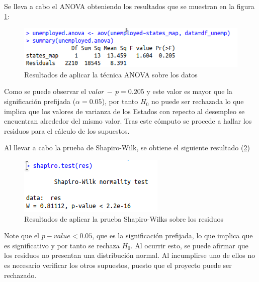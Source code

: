 \documentclass[a4paper,10pt,twocolumn]{article}
\begin{document}
Se lleva a cabo el ANOVA obteniendo los resultados que se muestran en la figura \ref{fig:anova_unemp}:
\begin{figure}[htb]
	\begin{center}
		\includegraphics[width=\columnwidth]{figures/unemployed_anova.png}
	\end{center}
	\caption{Resultados de aplicar la técnica ANOVA sobre los datos \label{fig:anova_unemp}}
\end{figure}

Como se puede observar el $valor \, -\, p = 0.205$ y este valor es mayor que la significación prefijada ($\alpha = 0.05$), por tanto $H_0$ no puede ser rechazada lo que implica que los valores de varianza de los Estados con repecto al desempleo se encuentran alrededor del mismo valor. Tras este cómputo se procede a hallar los residuos para el cálculo de los supuestos.

Al llevar a cabo la prueba de Shapiro-Wilk, se obtiene el siguiente resultado (\ref{fig:shapiro_unemp})
\begin{figure}[htb]
	\begin{center}
		\includegraphics[width=\columnwidth]{figures/unemployed_shapiro.png}
	\end{center}
	\caption{Resultados de aplicar la prueba Shapiro-Wilks sobre los residuos \label{fig:shapiro_unemp}}
\end{figure}
Note que el $p-value < 0.05$, que es la significación prefijada, lo que implica que es significativo y por tanto se rechaza $H_0$. Al ocurrir esto, se puede afirmar que los residuos no presentan una distribución normal. Al incumplirse uno de ellos no es necesario verificar los otros supuestos, puesto que el proyecto puede ser rechazado.
\end{document}
